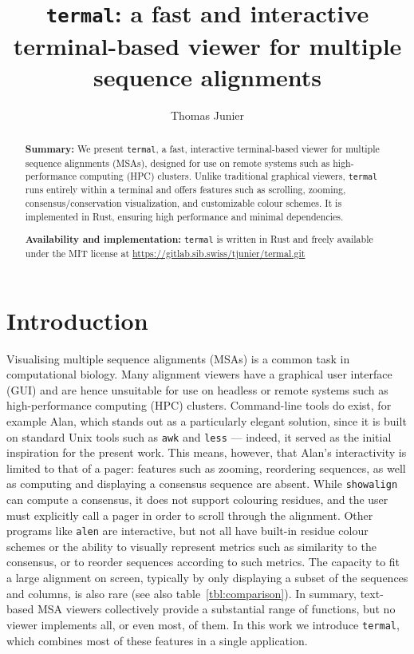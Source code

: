 \documentclass[11pt]{article}
\title{%
\texttt{termal}: a fast and interactive terminal-based viewer for multiple sequence alignments
}
\author[1]{Thomas Junier}
\affil[1]{Swiss Institute of Bioinformatics, Vital-\textsc{it} Group, Bâtiment
Amphipôle, Quartier UNIL-Sorge, CH-1015 Lausanne, Switzerland -- 
\texttt{thomas.junier@sib.swiss} -- ORCID: 0000-0002-4015-5969}
\date{} %
\begin{document}
\maketitle

\begin{abstract} \textbf{Summary:} We present \texttt{termal}, a fast,
  interactive terminal-based viewer for multiple sequence alignments (MSAs),
  designed for use on remote systems such as high-performance computing (HPC)
  clusters. Unlike traditional graphical viewers, \texttt{termal} runs entirely
  within a terminal and offers features such as scrolling, zooming,
  consensus/conservation visualization, and customizable colour schemes. It is
  implemented in Rust, ensuring high performance and minimal dependencies.

	\textbf{Availability and implementation:} \texttt{termal} is written in Rust
	and freely available under the MIT license at
	\url{https://gitlab.sib.swiss/tjunier/termal.git}

\end{abstract}

\section*{Introduction}

Visualising multiple sequence alignments (MSAs) is a common task in
computational biology. Many alignment viewers have a graphical user interface
(GUI) and are hence unsuitable for use on headless or remote systems such as
high-performance computing (HPC) clusters.  Command-line tools do exist, for
example Alan\cite{alan}, which stands out as a particularly elegant solution,
since it is built on standard Unix tools such as \texttt{awk} and \texttt{less}
--- indeed, it served as the initial inspiration for the present work. This
means, however, that Alan's interactivity is limited to that of a pager:
features such as zooming, reordering sequences, as well as computing and
displaying a consensus sequence are absent. While
\texttt{showalign}\cite{emboss} can compute a consensus, it does not support
colouring residues, and the user must explicitly call a pager in order to scroll
through the alignment. Other programs like \texttt{alen}\cite{alen} are
interactive, but not all have built-in residue colour schemes or the ability to
visually represent metrics such as similarity to the consensus, or to reorder
sequences according to such metrics. The capacity to fit a large alignment on
screen, typically by only displaying a subset of the sequences and columns, is
also rare (see also table~\ref{tbl:comparison}). In summary, text-based MSA
viewers collectively provide a substantial range of functions, but no viewer
implements all, or even most, of them. In this work we introduce
\texttt{termal}, which combines most of these features in a single application.
\end{document}
